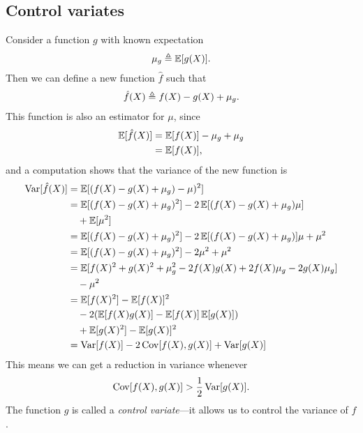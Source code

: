 \subsection{Control variates}
Consider a function $g$ with known expectation
\begin{align*}
  \mu_{g} \triangleq \operatorname{\mathbb{E}} [ g(X) ].
\end{align*}
Then we can define a new function $\hat{f}$ such that
\begin{align*}
  \hat{f}(X) \triangleq f(X) - g(X) + \mu_{g}.
\end{align*}
This function is also an estimator for $\mu$, since
\begin{align*}
    \operatorname{\mathbb{E}} [ \hat{f}(X) ] &= \operatorname{\mathbb{E}} [ f(X) ] - \mu_{g} + \mu_{g} \\
        &= \operatorname{\mathbb{E}} [ f(X) ],
\end{align*}
and a computation shows that the variance of the new function is
\begin{align*}
  \operatorname{Var} [ \hat{f}(X) ]
    &= \operatorname{\mathbb{E}} [ (f(X) - g(X) + \mu_{g}) - \mu)^2 ] \\
    &= \operatorname{\mathbb{E}} [ (f(X) - g(X) + \mu_{g})^2 ] - 2\operatorname{\mathbb{E}} [ (f(X) - g(X) + \mu_{g})\mu ] \\
    &\quad+ \operatorname{\mathbb{E}} [ \mu^2 ] \\
    &= \operatorname{\mathbb{E}} [ (f(X) - g(X) + \mu_{g})^2 ] - 2\operatorname{\mathbb{E}} [ (f(X) - g(X) + \mu_{g})]\mu + \mu^2 \\
    &= \operatorname{\mathbb{E}} [ (f(X) - g(X) + \mu_{g})^2 ] - 2\mu^2  + \mu^2 \\
    &= \operatorname{\mathbb{E}} [ f(X)^2 + g(X)^2 + \mu_{g}^2 - 2f(X)g(X) + 2f(X)\mu_{g} - 2g(X)\mu_{g} ] \\
    &\quad- \mu^2\\
    &= \operatorname{\mathbb{E}} [ f(X)^2 ] - \operatorname{\mathbb{E}} [ f(X) ]^2 \\
      &\quad - 2(\operatorname{\mathbb{E}} [ f(X)g(X) ] - \operatorname{\mathbb{E}} [ f(X) ]\operatorname{\mathbb{E}} [ g(X) ]) \\
      &\quad + \operatorname{\mathbb{E}} [ g(X)^2 ] - \operatorname{\mathbb{E}} [ g(X) ]^2 \\
    &= \operatorname{Var} [ f(X) ] - 2  \operatorname{Cov} [ f(X), g(X) ] + \operatorname{Var} [ g(X) ]
\end{align*}
This means we can get a reduction in variance whenever
\begin{equation*}
  \operatorname{Cov} [ f(X), g(X) ] > \frac{1}{2} \operatorname{Var} [ g(X) ].
\end{equation*}
The function $g$ is called a \textit{control variate}---it allows us to control the variance of $f$.

